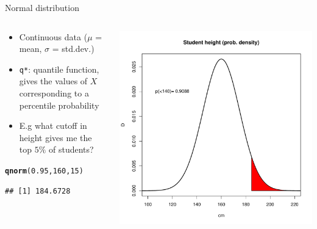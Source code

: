 \documentclass[aspectratio=169]{beamer}\usepackage[]{graphicx}\usepackage[]{color}
\makeatletter
\def\maxwidth{ %
  \ifdim\Gin@nat@width>\linewidth
    \linewidth
  \else
    \Gin@nat@width
  \fi
}
\newcommand{\hlnum}[1]{\textcolor[rgb]{0.686,0.059,0.569}{#1}}%
\newcommand{\hlstd}[1]{\textcolor[rgb]{0.345,0.345,0.345}{#1}}%
\newcommand{\hlkwd}[1]{\textcolor[rgb]{0.737,0.353,0.396}{\textbf{#1}}}%
\newenvironment{kframe}{%
 \def\at@end@of@kframe{}%
 \ifinner\ifhmode%
  \def\at@end@of@kframe{\end{minipage}}%
  \begin{minipage}{\columnwidth}%
 \fi\fi%
 \def\FrameCommand##1{\hskip\@totalleftmargin \hskip-\fboxsep
 \colorbox{shadecolor}{##1}\hskip-\fboxsep
     \hskip-\linewidth \hskip-\@totalleftmargin \hskip\columnwidth}%
 \MakeFramed {\advance\hsize-\width
   \@totalleftmargin\z@ \linewidth\hsize
   \@setminipage}}%
 {\par\unskip\endMakeFramed%
 \at@end@of@kframe}
\newenvironment{knitrout}{}{} %
\makeatother
\begin{document}
\begin{frame}[fragile]{Normal distribution}
\begin{columns}
  \begin{column}{0.5\textwidth}
  \begin{itemize}
    \item Continuous data ($\mu$ = mean, $\sigma$ = std.dev.)
    \item \texttt{q*}: quantile function, gives the values of $X$ corresponding to a percentile probability
    \item E.g what cutoff in height gives me the top $5\%$ of students?
  \end{itemize}
\begin{knitrout}\scriptsize
{}\color{fgcolor}\begin{kframe}
\begin{alltt}
\hlkwd{qnorm}\hlstd{(}\hlnum{0.95}\hlstd{,} \hlnum{160}\hlstd{,} \hlnum{15}\hlstd{)}
\end{alltt}
\begin{verbatim}
## [1] 184.6728
\end{verbatim}
\end{kframe}
\end{knitrout}
  \end{column}
  \begin{column}{0.5\textwidth}
\begin{knitrout}\scriptsize
{}\color{fgcolor}
\includegraphics[width=\maxwidth]{figure/unnamed-chunk-16-1} 

\end{knitrout}
  \end{column}
\end{columns}
\end{frame}
\end{document}
